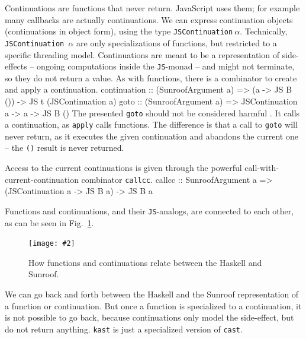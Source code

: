 \documentclass{llncs}
\newcommand{\Src}[1]{{\tt{#1}}}
\newcommand{\JS}{\Src{JS}}
\newcommand{\Figure}[3]{%
\FigureS{#1}{#2}{#3}{scale=0.55,clip=true,trim=0.45cm 0.45cm 0.45cm 0.45cm}
}
\newcommand{\FigureS}[4]{%
\begin{figure}[t]%
\begin{center}%
\texttt{[image: \#2]}%
\vspace{-0.5cm}%
\end{center}%
\caption{#3}%
\label{#1}%
\end{figure}%
}
\newenvironment{Code}{\verbatim}{\endverbatim}
\newcommand{\FigRef}[1]{Fig.~\ref{#1}}
\begin{document}
Continuations are functions that never return. JavaScript uses them; 
for example many callbacks are actually continuations. We can express
continuation objects (continuations in object form),
using the type \Src{JSContinuation$~\alpha$}.
Technically, \Src{JSContinuation $\alpha$} are only
specializations of functions, but
restricted to a specific threading model. Continuations
are meant to be a representation of side-effects -- 
ongoing computations inside the \JS-monad -- and might  
not terminate, so they do not return a value. As with functions, 
there is a combinator to create and apply a continuation.
\begin{Code}
continuation :: (SunroofArgument a) 
             => (a -> JS B ()) -> JS t (JSContinuation a)
goto         :: (SunroofArgument a) 
             => JSContinuation a -> a -> JS B ()
\end{Code}
The presented \Src{goto} should not be considered 
harmful \cite{Dijkstra:68:GotoConsideredHarmful}.
It calls a continuation,
as \Src{apply} calls functions.
The difference is that a call to \Src{goto} will never
return, as it executes the given continuation and abandons the 
current one -- the \Src{()} result is never returned.

Access to the current continuations is given through
the powerful call-with-current-continuation 
combinator \Src{callcc}.
\begin{Code}
callcc :: SunroofArgument a 
       => (JSContinuation a -> JS B a) -> JS B a
\end{Code}

Functions and continuations, and their \Src{JS}-analogs,
are connected  to each other, as can be seen in \FigRef{fig:func-cont}.
\Figure%
{fig:func-cont}%
{figures/sunroof-func-cont.pdf}%
{How functions and continuations relate between the Haskell and Sunroof.}%
We can go back and forth between the Haskell and the Sunroof
representation of a function or continuation. But once a function
is specialized to a continuation, it is not possible to go back,
because continuations only model the side-effect, but do 
not return anything. \Src{kast} is just a specialized version of \Src{cast}.



\end{document}
